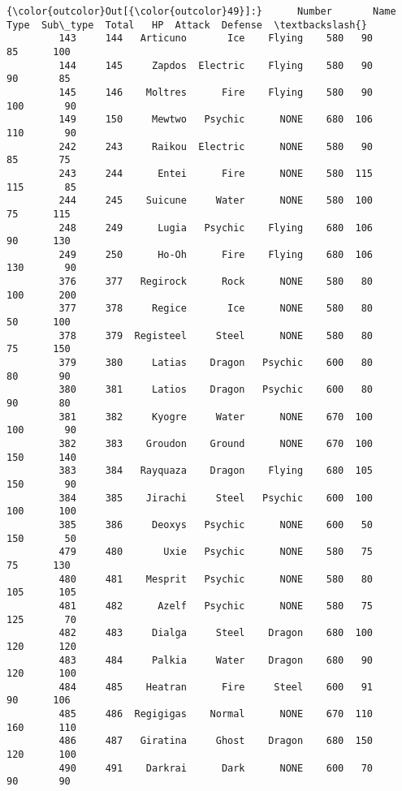 \documentclass[11pt]{article}
\begin{document}
\begin{Verbatim}[commandchars=\\\{\}]
{\color{outcolor}Out[{\color{outcolor}49}]:}      Number       Name      Type  Sub\_type  Total   HP  Attack  Defense  \textbackslash{}
         143     144   Articuno       Ice    Flying    580   90      85      100   
         144     145     Zapdos  Electric    Flying    580   90      90       85   
         145     146    Moltres      Fire    Flying    580   90     100       90   
         149     150     Mewtwo   Psychic      NONE    680  106     110       90   
         242     243     Raikou  Electric      NONE    580   90      85       75   
         243     244      Entei      Fire      NONE    580  115     115       85   
         244     245    Suicune     Water      NONE    580  100      75      115   
         248     249      Lugia   Psychic    Flying    680  106      90      130   
         249     250      Ho-Oh      Fire    Flying    680  106     130       90   
         376     377   Regirock      Rock      NONE    580   80     100      200   
         377     378     Regice       Ice      NONE    580   80      50      100   
         378     379  Registeel     Steel      NONE    580   80      75      150   
         379     380     Latias    Dragon   Psychic    600   80      80       90   
         380     381     Latios    Dragon   Psychic    600   80      90       80   
         381     382     Kyogre     Water      NONE    670  100     100       90   
         382     383    Groudon    Ground      NONE    670  100     150      140   
         383     384   Rayquaza    Dragon    Flying    680  105     150       90   
         384     385    Jirachi     Steel   Psychic    600  100     100      100   
         385     386     Deoxys   Psychic      NONE    600   50     150       50   
         479     480       Uxie   Psychic      NONE    580   75      75      130   
         480     481    Mesprit   Psychic      NONE    580   80     105      105   
         481     482      Azelf   Psychic      NONE    580   75     125       70   
         482     483     Dialga     Steel    Dragon    680  100     120      120   
         483     484     Palkia     Water    Dragon    680   90     120      100   
         484     485    Heatran      Fire     Steel    600   91      90      106   
         485     486  Regigigas    Normal      NONE    670  110     160      110   
         486     487   Giratina     Ghost    Dragon    680  150     120      100   
         490     491    Darkrai      Dark      NONE    600   70      90       90   

\end{Verbatim}
\end{document}
